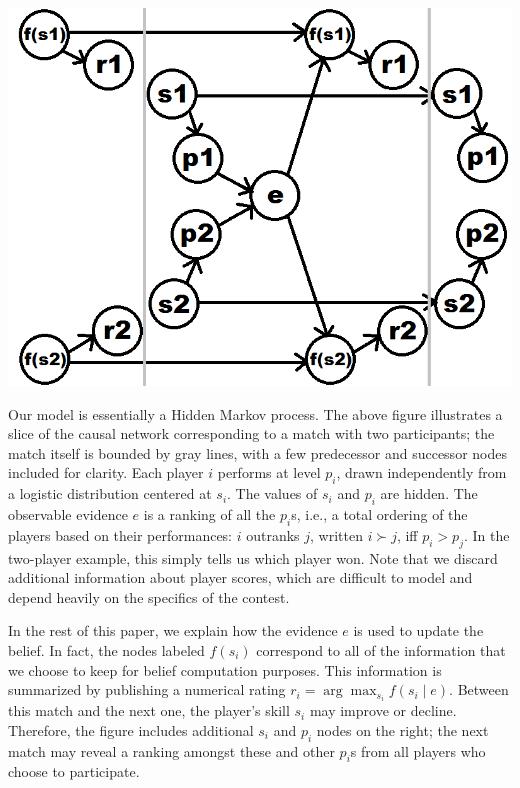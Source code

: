 \documentclass{article}
\begin{document}
\begin{center} \includegraphics[scale=0.35]{../images/HMMlabeled.png} \end{center}

Our model is essentially a Hidden Markov process. The above figure illustrates a slice of the causal network corresponding to a match with two participants; the match itself is bounded by gray lines, with a few predecessor and successor nodes included for clarity. Each player $i$ performs at level $p_i$, drawn independently from a logistic distribution centered at $s_i$. The values of $s_i$ and $p_i$ are hidden. The observable evidence $e$ is a ranking of all the $p_i$s, i.e., a total ordering of the players based on their performances: $i$ outranks $j$, written $i \succ j$, iff $p_i > p_j$. In the two-player example, this simply tells us which player won. Note that we discard additional information about player scores, which are difficult to model and depend heavily on the specifics of the contest.

In the rest of this paper, we explain how the evidence $e$ is used to update the belief. In fact, the nodes labeled $f(s_i)$ correspond to all of the information that we choose to keep for belief computation purposes. This information is summarized by publishing a numerical rating $r_i = \arg\max_{s_i} f(s_i\mid e)$. Between this match and the next one, the player's skill $s_i$ may improve or decline. Therefore, the figure includes additional $s_i$ and $p_i$ nodes on the right; the next match may reveal a ranking amongst these and other $p_i$s from all players who choose to participate.
\end{document}
